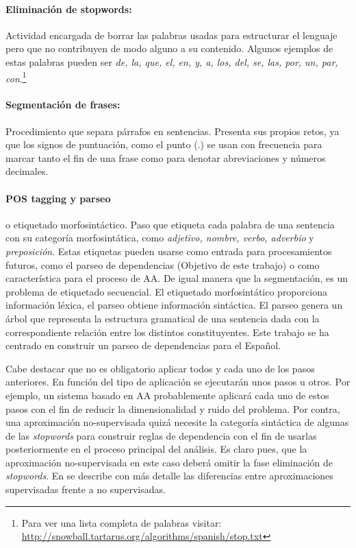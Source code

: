 \paragraph{Eliminación de stopwords:} Actividad encargada de borrar las palabras
usadas para estructurar el lenguaje pero que no contribuyen de modo alguno a su
contenido. Algunos ejemplos de estas palabras pueden ser \emph{de, la, que, el,
  en, y, a, los, del, se, las, por, un, par, con}.\footnote{Para ver una lista
  completa de palabras visitar:
  \url{http://snowball.tartarus.org/algorithms/spanish/stop.txt}}

\paragraph{Segmentación de frases:}Procedimiento que separa párrafos en
sentencias. Presenta sus propios retos, ya que los signos de puntuación, como el
punto (.) se usan con frecuencia para marcar tanto el fin de una frase como para
denotar abreviaciones y números decimales.

\paragraph{POS tagging y parseo} o etiquetado morfosintáctico. Paso que etiqueta
cada palabra de una sentencia con su categoría morfosintática, como
\emph{adjetivo, nombre, verbo, adverbio} y \emph{preposición}. Estas etiquetas
pueden usarse como entrada para procesamientos futuros, como el parseo de
dependencias (Objetivo de este trabajo) o como característica para el proceso de
\ac{AA}. De igual manera que la segmentación, es un problema de etiquetado
secuencial. El etiquetado morfosintático proporciona información léxica, el
parseo obtiene información sintáctica. El parseo genera un árbol que representa
la estructura gramatical de una sentencia dada con la correspondiente relación
entre los distintos constituyentes. Este trabajo se ha centrado en construir un
parseo de dependencias para el Español.

Cabe destacar que no es obligatorio aplicar todos y cada uno de los pasos
anteriores. En función del tipo de aplicación se ejecutarán unos pasos u
otros. Por ejemplo, un sistema basado en \ac{AA} probablemente aplicará cada uno
de estos pasos con el fin de reducir la dimensionalidad y ruido del
problema. Por contra, una aproximación no-supervisada quizá necesite la
categoría sintáctica de algunas de las \emph{stopwords} para construir reglas de
dependencia con el fin de usarlas posteriormente en el proceso principal del
análisis. Es claro pues, que la aproximación no-supervisada en este caso deberá
omitir la fase eliminación de \emph{stopwords}. En  se
describe con más detalle las diferencias entre aproximaciones supervisadas
frente a no supervisadas.

